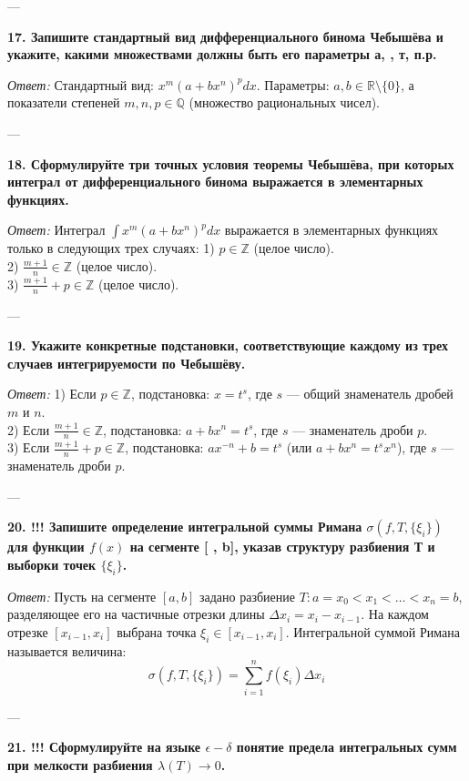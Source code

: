 \documentclass{article}
\begin{document}
---

\textbf{17. Запишите стандартный вид дифференциального бинома Чебышёва и укажите, какими множествами должны быть его параметры а, , т, п.р.}

\textit{Ответ:} Стандартный вид: $x^m (a + b x^n)^p dx$. Параметры: $a, b \in \mathbb{R} \setminus \{0\}$, а показатели степеней $m, n, p \in \mathbb{Q}$ (множество рациональных чисел).

---

\textbf{18. Сформулируйте три точных условия теоремы Чебышёва, при которых интеграл от дифференциального бинома выражается в элементарных функциях.}

\textit{Ответ:} Интеграл $\int x^m (a + b x^n)^p dx$ выражается в элементарных функциях только в следующих трех случаях:
1) $p \in \mathbb{Z}$ (целое число). \\
2) $\frac{m+1}{n} \in \mathbb{Z}$ (целое число). \\
3) $\frac{m+1}{n} + p \in \mathbb{Z}$ (целое число).

---

\textbf{19. Укажите конкретные подстановки, соответствующие каждому из трех случаев интегрируемости по Чебышёву.}

\textit{Ответ:}
1) Если $p \in \mathbb{Z}$, подстановка: $x = t^s$, где $s$ — общий знаменатель дробей $m$ и $n$. \\
2) Если $\frac{m+1}{n} \in \mathbb{Z}$, подстановка: $a + b x^n = t^s$, где $s$ — знаменатель дроби $p$. \\
3) Если $\frac{m+1}{n} + p \in \mathbb{Z}$, подстановка: $a x^{-n} + b = t^s$ (или $a + bx^n = t^s x^n$), где $s$ — знаменатель дроби $p$.

---

\textbf{20. !!! Запишите определение интегральной суммы Римана $\sigma(f,T,\{\xi_{i}\})$ для функции $f(x)$ на сегменте [ , b], указав структуру разбиения Т и выборки точек $\{\xi_{i}\}$.}

\textit{Ответ:} Пусть на сегменте $[a, b]$ задано разбиение $T: a = x_0 < x_1 < \dots < x_n = b$, разделяющее его на частичные отрезки длины $\Delta x_i = x_i - x_{i-1}$. На каждом отрезке $[x_{i-1}, x_i]$ выбрана точка $\xi_i \in [x_{i-1}, x_i]$. Интегральной суммой Римана называется величина:
$$ \sigma(f, T, \{\xi_i\}) = \sum_{i=1}^n f(\xi_i) \Delta x_i $$

---

\textbf{21. !!! Сформулируйте на языке $\epsilon-\delta$ понятие предела интегральных сумм при мелкости разбиения $\lambda(T)\rightarrow0$.}
\end{document}

